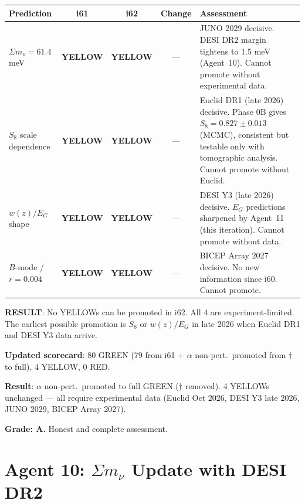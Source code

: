 \documentclass[11pt,a4paper]{article}
\newcommand{\YELLOW}{\textcolor{dfdyellow}{\textbf{YELLOW}}}
\begin{document}
\begin{center}
\begin{longtable}{p{3.5cm}cccp{5cm}}
\toprule
\textbf{Prediction} & \textbf{i61} & \textbf{i62} & \textbf{Change} & \textbf{Assessment} \\
\midrule
$\Sigma m_\nu = 61.4$ meV & \YELLOW & \YELLOW & --- & JUNO 2029 decisive. DESI DR2 margin tightens to 1.5 meV (Agent~10). Cannot promote without experimental data. \\
$S_8$ scale dependence & \YELLOW & \YELLOW & --- & Euclid DR1 (late 2026) decisive. Phase 0B gives $S_8 = 0.827 \pm 0.013$ (MCMC), consistent but testable only with tomographic analysis. Cannot promote without Euclid. \\
$w(z)/E_G$ shape & \YELLOW & \YELLOW & --- & DESI Y3 (late 2026) decisive. $E_G$ predictions sharpened by Agent~11 (this iteration). Cannot promote without data. \\
$B$-mode / $r = 0.004$ & \YELLOW & \YELLOW & --- & BICEP Array 2027 decisive. No new information since i60. Cannot promote. \\
\bottomrule
\end{longtable}
\end{center}

\textbf{RESULT}: No YELLOWs can be promoted in i62. All 4 are experiment-limited. The earliest possible promotion is $S_8$ or $w(z)/E_G$ in late 2026 when Euclid DR1 and DESI Y3 data arrive.

\textbf{Updated scorecard}: 80 GREEN (79 from i61 + $\alpha$ non-pert.\ promoted from $\dagger$ to full), 4 YELLOW, 0 RED.

\begin{tcolorbox}[colback=yellow!5!white, colframe=yellow!60!black, title={Agent 9: 4 YELLOWs Remain --- All Experiment-Limited}]
\textbf{Result}: $\alpha$ non-pert.\ promoted to full GREEN ($\dagger$ removed). 4 YELLOWs unchanged --- all require experimental data (Euclid Oct 2026, DESI Y3 late 2026, JUNO 2029, BICEP Array 2027).

\textbf{Grade: A.} Honest and complete assessment.
\end{tcolorbox}


\part{Agent 10: $\Sigma m_\nu$ Update with DESI DR2}
\label{part:neutrino-mass}
\end{document}
